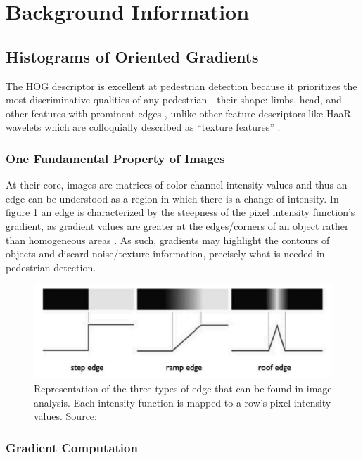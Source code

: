 \section{Background Information}
\subsection{Histograms of Oriented Gradients}\label{sec:hog}

The HOG descriptor is excellent at pedestrian detection because it prioritizes the most discriminative qualities of any pedestrian - their shape: limbs, head, and other features with prominent edges \cite{dalal_2005_histograms}, unlike other feature descriptors like HaaR wavelets which are colloquially described as “texture features” \cite{zia_2015_why}.

\subsubsection{One Fundamental Property of Images}

At their core, images are matrices of color channel intensity values \cite{rein_image_definition} and thus an edge can be understood as a region in which there is a change of intensity. In figure \ref{fig:pixel_intensity} an edge is characterized by the steepness of the pixel intensity function's gradient, as gradient values are greater at the edges/corners of an object rather than homogeneous areas \cite{niebles2012edge}. As such, gradients may highlight the contours of objects and discard noise/texture information, precisely what is needed in pedestrian detection.

\begin{figure}
    \centering
    \includegraphics[width=0.75\linewidth]{images/pixel_intensity.png}
    \caption{Representation of the three types of edge that can be found in image analysis. Each intensity function is mapped to a row's pixel intensity values. Source: \cite{niebles2012edge}}
    \label{fig:pixel_intensity}
\end{figure}

\subsubsection{Gradient Computation}\label{sec:deriv_mask}


